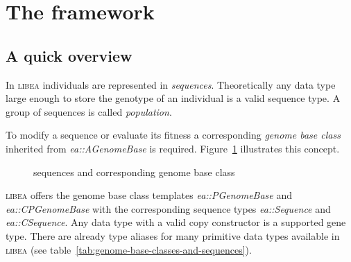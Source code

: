 \documentclass[a4paper]{article}
\begin{document}
\section{The framework}

\subsection{A quick overview}

In \textsc{libea} individuals are represented in \textit{sequences}. Theoretically any data type large enough to store the genotype of an individual is a valid sequence type. A group of sequences is called \textit{population}.

To modify a sequence or evaluate its fitness a corresponding \textit{genome base class} inherited from \textit{ea::AGenomeBase} is required. Figure~\ref{fig:overview} illustrates this concept.

\begin{figure}[h]
\caption{sequences and corresponding genome base class}
\label{fig:overview}
{

}
\end{figure}

\textsc{libea} offers the genome base class templates \textit{ea::PGenomeBase} and \textit{ea::CPGenomeBase} with the corresponding sequence types \textit{ea::Sequence} and \textit{ea::CSequence}. Any data type with a valid copy constructor is a supported gene type. There are already type aliases for many primitive data types available in \textsc{libea} (see table~\ref{tab:genome-base-classes-and-sequences}).
\end{document}
